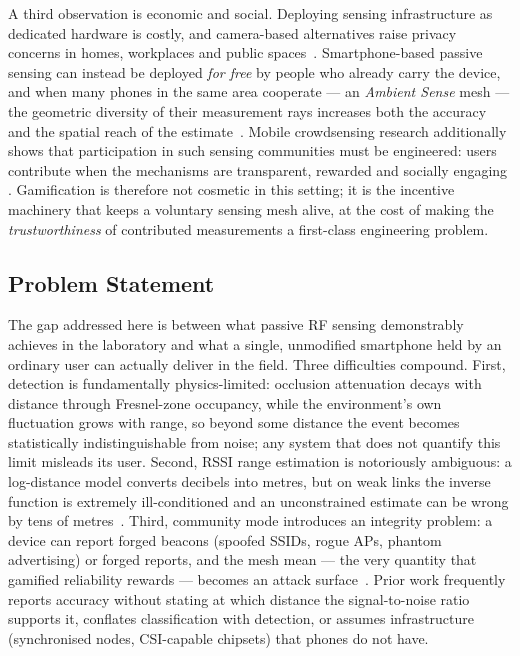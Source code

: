 \documentclass[journal,10pt]{IEEEtran}
\begin{document}
A third observation is economic and social. Deploying sensing infrastructure as
dedicated hardware is costly, and camera-based alternatives raise privacy
concerns in homes, workplaces and public spaces~\cite{khan2023,zhou2020,dmip2023}.
Smartphone-based passive sensing can instead be deployed \emph{for free} by
people who already carry the device, and when many phones in the same area
cooperate --- an \emph{Ambient Sense} mesh --- the geometric diversity of their
measurement rays increases both the accuracy and the spatial reach of the
estimate~\cite{li2024}. Mobile crowdsensing research additionally shows that
participation in such sensing communities must be engineered: users contribute
when the mechanisms are transparent, rewarded and socially engaging
\cite{zhang2022,wang2018}. Gamification is therefore not cosmetic in this
setting; it is the incentive machinery that keeps a voluntary sensing mesh
alive, at the cost of making the \emph{trustworthiness} of contributed
measurements a first-class engineering problem.

\subsection{Problem Statement}
The gap addressed here is between what passive RF sensing demonstrably achieves
in the laboratory and what a single, unmodified smartphone held by an ordinary
user can actually deliver in the field. Three difficulties compound. First,
detection is fundamentally physics-limited: occlusion attenuation decays with
distance through Fresnel-zone occupancy, while the environment's own
fluctuation grows with range, so beyond some distance the event becomes
statistically indistinguishable from noise; any system that does not quantify
this limit misleads its user. Second, RSSI range estimation is notoriously
ambiguous: a log-distance model converts decibels into metres, but on weak links
the inverse function is extremely ill-conditioned and an unconstrained estimate
can be wrong by tens of metres~\cite{ramirez2021,milano2024}. Third, community
mode introduces an integrity problem: a device can report forged beacons
(spoofed SSIDs, rogue APs, phantom advertising) or forged reports, and the mesh
mean --- the very quantity that gamified reliability rewards --- becomes an
attack surface~\cite{casar2022,antonioli2020}. Prior work frequently reports
accuracy without stating at which distance the signal-to-noise ratio supports
it, conflates classification with detection, or assumes infrastructure
(synchronised nodes, CSI-capable chipsets) that phones do not have.
\end{document}
